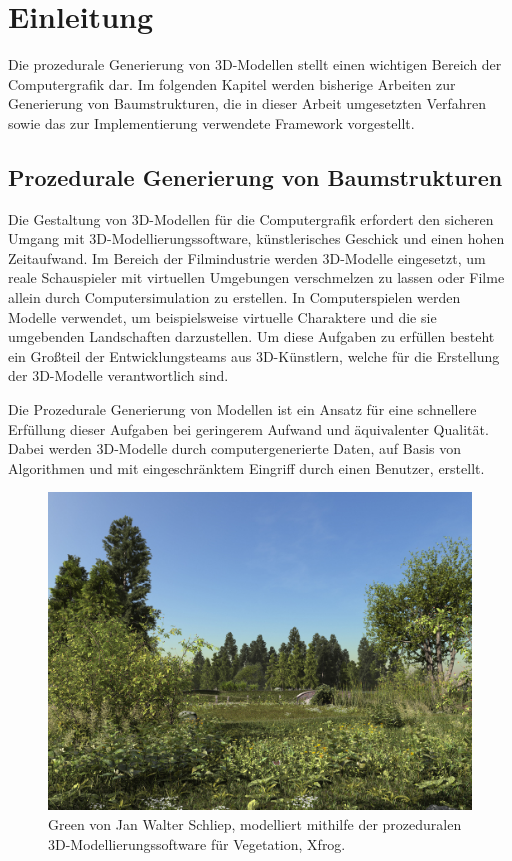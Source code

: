 \chapter{Einleitung}

Die prozedurale Generierung von 3D-Modellen stellt einen wichtigen Bereich der Computergrafik dar. Im folgenden Kapitel werden bisherige Arbeiten zur Generierung von Baumstrukturen, die in dieser Arbeit umgesetzten Verfahren sowie das zur Implementierung verwendete Framework vorgestellt. 

\section{Prozedurale Generierung von Baumstrukturen}

Die Gestaltung von 3D-Modellen für die Computergrafik erfordert den sicheren Umgang mit 3D-Modellierungssoftware, künstlerisches Geschick und einen hohen Zeitaufwand. Im Bereich der Filmindustrie werden 3D-Modelle eingesetzt, um reale Schauspieler mit virtuellen Umgebungen verschmelzen zu lassen oder Filme allein durch Computersimulation zu erstellen. \cite[S.5]{Deussen:05} In Computerspielen werden Modelle verwendet, um beispielsweise virtuelle Charaktere und die sie umgebenden Landschaften darzustellen. Um diese Aufgaben zu erfüllen besteht ein Großteil der Entwicklungsteams aus 3D-Künstlern, welche für die Erstellung der 3D-Modelle verantwortlich sind. \cite[S.3]{PCGiG:16}

Die Prozedurale Generierung von Modellen ist ein Ansatz für eine schnellere Erfüllung dieser Aufgaben bei geringerem Aufwand und äquivalenter Qualität. Dabei werden 3D-Modelle durch computergenerierte Daten, auf Basis von Algorithmen und mit eingeschränktem Eingriff durch einen Benutzer, erstellt. \cite[S.1]{PCGiG:16} 

\begin{figure} [htbp]
	\centering
	\includegraphics[width=.7\textwidth]{images/greenXfrog_JanWalterSchliep.jpg}
	\caption{\glqq Green\grqq{} von Jan Walter Schliep, modelliert mithilfe der prozeduralen 3D-Modellierungssoftware für Vegetation, \glqq Xfrog\grqq. \cite{GreenOne:16}}
	\label{fig:greenXfrog_JanWalterSchliep}
\end{figure}

